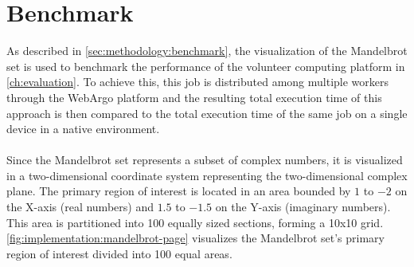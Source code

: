 \section{Benchmark}
\label{sec:implementation:benchmark}
As described in \autoref{sec:methodology:benchmark}, the visualization of the Mandelbrot set is used to benchmark the performance of the volunteer computing platform in \autoref{ch:evaluation}. To achieve this, this job is distributed among multiple workers through the WebArgo platform and the resulting total execution time of this approach is then compared to the total execution time of the same job on a single device in a native environment.
\\~\\
Since the Mandelbrot set represents a subset of complex numbers, it is visualized in a two-dimensional coordinate system representing the two-dimensional complex plane. The primary region of interest is located in an area bounded by $1$ to $-2$ on the X-axis (real numbers) and $1.5$ to $-1.5$ on the Y-axis (imaginary numbers). This area is partitioned into 100 equally sized sections, forming a 10x10 grid. \autoref{fig:implementation:mandelbrot-page} visualizes the Mandelbrot set's primary region of interest divided into 100 equal areas. 

